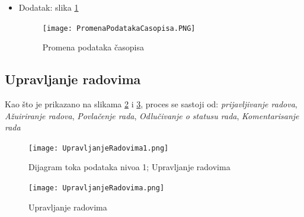 \documentclass[a4paper]{article}
\begin{document}
\begin{itemize}
\begin{enumerate}
\begin{enumerate}
\begin{enumerate}
                    \end{enumerate}
                    \item Administrator proverava da li je funkcionalnost slanja podataka preko forme dobro implementirana.
                    \begin{enumerate}
                        \item Administrator popravlja funkcionalnost i pokušava ponovo da sačuva podatke.
                        \item Administrator šalje zahtev za čuvanjem podataka
                        \item Ako je sistem sačuvao nove podatke, prelazi se na korak 5. osnovnog toka.
                        \item Ako ne, prelazi se na korak 1.d) alternativnog toka.
                    \end{enumerate}
                    \item Ozbiljna greška sistema. Administrator traži grešku i pokušava da je otkloni.
                \end{enumerate}
        \end{enumerate}
        \item Dodatak: slika \ref{fig:promenapodatkacasopisa}
        \begin{figure}[hbt!]
    \centering
    \texttt{[image: PromenaPodatakaCasopisa.PNG]}
    \caption{Promena podataka časopisa \cite{smalkov} \cite{vparadigm}}
    \label{fig:promenapodatkacasopisa}
\end{figure}
\end{itemize} 
\newpage

\subsection{Upravljanje radovima}
\label{subsection:upravljanjeradovimasec}

Kao što je prikazano na slikama \ref{fig:nivo1} i \ref{fig:upravljanjeradovima}, proces se sastoji od: \textit{prijavljivanje radova}, \textit{Ažuiriranje radova}, \textit{Povlačenje rada}, \textit{Odlučivanje o statusu rada}, \textit{Komentarisanje rada}
\begin{figure}[hbt!]
    \center
    \texttt{[image: UpravljanjeRadovima1.png]}
    \caption{Dijagram toka podataka nivoa 1; Upravljanje radovima \cite{smalkov} \cite{vparadigm}}
    \label{fig:nivo1}
\end{figure}
\begin{figure}[hbt!]
    \centering
    \texttt{[image: UpravljanjeRadovima.png]}
    \caption{Upravljanje radovima \cite{alex} \cite{vparadigm}}
    \label{fig:upravljanjeradovima}
\end{figure}
\end{document}
